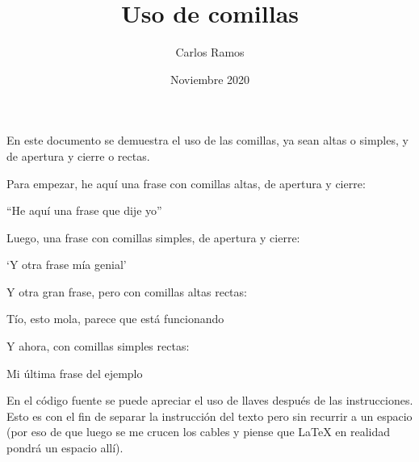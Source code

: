 \documentclass{article}
\title{Uso de comillas}
\author{Carlos Ramos}
\date{Noviembre 2020}
\begin{document}
\maketitle

En este documento se demuestra el uso de las comillas, ya sean altas o
simples, y de apertura y cierre o rectas.\newline

Para empezar, he aquí una frase con comillas altas, de apertura y
cierre:

``He aquí una frase que dije yo''\newline

Luego, una frase con comillas simples, de apertura y cierre:

`Y otra frase mía genial'\newline

Y otra gran frase, pero con comillas altas rectas:

\textquotedbl{}Tío, esto mola, parece que está
funcionando\textquotedbl{}\newline

Y ahora, con comillas simples rectas:

\textquotesingle{}Mi última frase del
ejemplo\textquotesingle{}\newline

En el código fuente se puede apreciar el uso de llaves después de las
instrucciones. Esto es con el fin de separar la instrucción del texto
pero sin recurrir a un espacio (por eso de que luego se me crucen los
cables y piense que \LaTeX{} en realidad pondrá un espacio allí).
\end{document}
